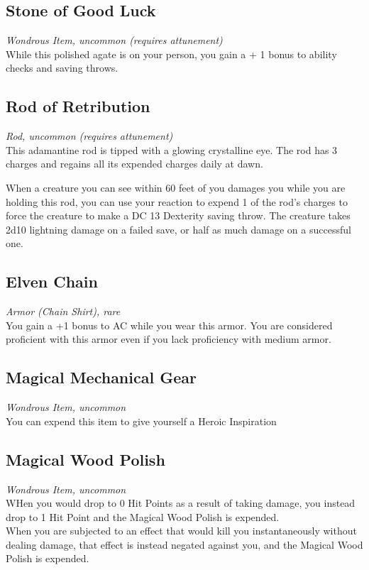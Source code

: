 \documentclass[letterpaper,openany,oneside,twocolumn]{book}
\begin{document}
\subsection*{Stone of Good Luck}
\textit{Wondrous Item, uncommon (requires attunement)}\\
While this polished agate is on your person, you gain a + 1 bonus to ability checks and saving throws.

\subsection*{Rod of Retribution}
\textit{Rod, uncommon (requires attunement)}\\
This adamantine rod is tipped with a glowing crystalline eye. The rod has 3 charges and regains all its expended charges daily at dawn.

When a creature you can see within 60 feet of you damages you while you are holding this rod, you can use your reaction to expend 1 of the rod's charges to force the creature to make a DC 13 Dexterity saving throw. The creature takes 2d10 lightning damage on a failed save, or half as much damage on a successful one.

\subsection*{Elven Chain}
\textit{Armor (Chain Shirt), rare}\\
You gain a +1 bonus to AC while you wear this armor. You are considered proficient with this armor even if you lack proficiency with medium armor.

\subsection*{Magical Mechanical Gear}
\textit{Wondrous Item, uncommon}\\
You can expend this item to give yourself a Heroic Inspiration

\subsection*{Magical Wood Polish}
\textit{Wondrous Item, uncommon}\\
WHen you would drop to 0 Hit Points as a result of taking damage, you instead drop to 1 Hit Point and the Magical Wood Polish is expended.\\
When you are subjected to an effect that would kill you instantaneously without dealing damage, that effect is instead negated against you, and the Magical Wood Polish is expended.
\end{document}
